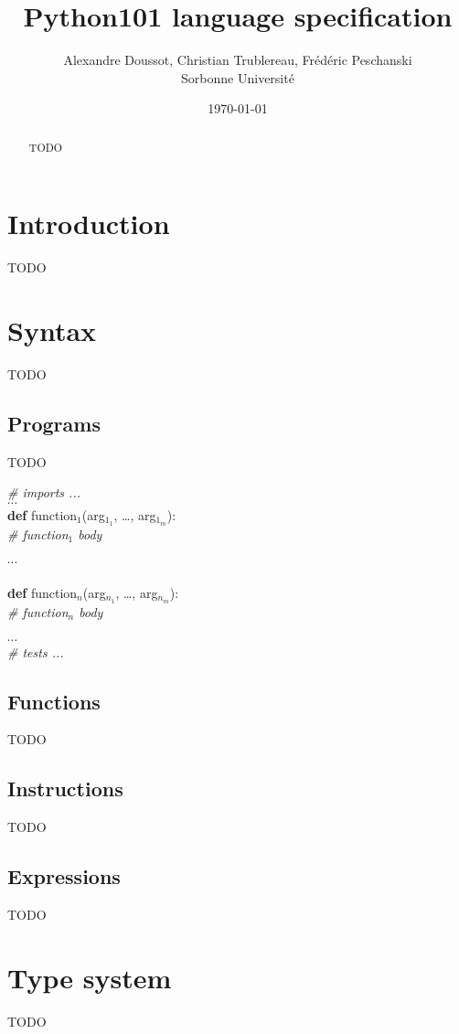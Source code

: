 \documentclass[a4paper]{article}
\newenvironment{program}{
\begin{sffamily}
\begin{scriptsize}
\begin{tabbing}}
{\end{tabbing}
\end{scriptsize}
\end{sffamily}}
\newcommand{\kw}[1]{\textsf{\textbf{#1}}}
\newcommand{\cmt}[1]{\textsf{\textit{#1}}}
\newcommand{\pindent}{\hspace{2em}\=}
\begin{document}
\setlength{\parskip}{1ex}
\setlength{\parindent}{0mm}


\title{Python101 language specification}

\author{Alexandre Doussot, Christian Trublereau, Frédéric Peschanski\\
Sorbonne Université}

\date{\today}

\maketitle
\begin{abstract}
TODO
\end{abstract}

\thispagestyle{fancy}

\section{Introduction}

TODO

\section{Syntax}

TODO

\subsection{Programs}

TODO

\begin{program}
\cmt{\# imports ...}\\
$\cdots$\\
\kw{def} function$_1$(arg$_{1_1}$, \ldots, arg$_{1_m}$):\\
\pindent \cmt{\# function$_1$ body}\\
\\
$\cdots$ \\
\\
\kw{def} function$_n$(arg$_{n_1}$, \ldots, arg$_{n_m}$):\\
\> \cmt{\# function$_n$ body}\\
\\
$\cdots$\\
\cmt{\# tests ...} \\
\end{program}

\subsection{Functions}

TODO

\subsection{Instructions}

TODO

\subsection{Expressions}

TODO

\section{Type system}

TODO
\end{document}
